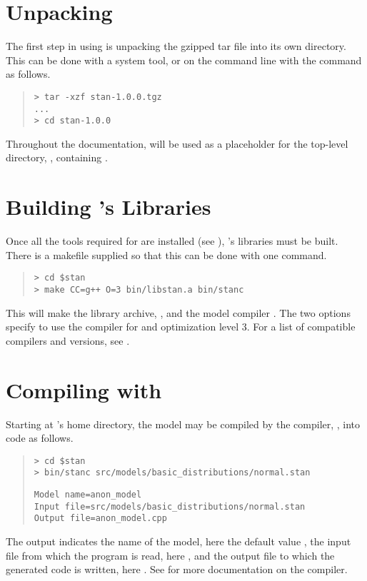 \section{Unpacking \Stan}

The first step in using \Stan is unpacking the gzipped tar file into
its own directory.  This can be done with a system tool, or on the
command line with the  command as follows.
%
\begin{quote}
\begin{Verbatim}[fontshape=sl]
> tar -xzf stan-1.0.0.tgz
...
> cd stan-1.0.0
\end{Verbatim}
\end{quote}
%
Throughout the documentation,  will be used as a
placeholder for the top-level directory, , containing
\Stan.


\section{Building \Stan's Libraries}

Once all the tools required for \Stan are installed (see
), \Stan's libraries must be built.  There is a
makefile supplied so that this can be done with one command.
%
\begin{quote}
\begin{Verbatim}[fontshape=sl]
> cd $stan
> make CC=g++ O=3 bin/libstan.a bin/stanc
\end{Verbatim}
\end{quote}
%
This will make the \Stan library archive, , and the
model compiler .  The two options specify to use the
 compiler for \Cpp and optimization level 3.  For a list
of compatible compilers and versions, see .




\section{Compiling  with }

Starting at \Stan's home directory, the model may be compiled by 
the \Stan compiler, \stanc, into \Cpp code as follows.
%
\begin{quote}
\begin{Verbatim}[fontshape=sl]
> cd $stan
> bin/stanc src/models/basic_distributions/normal.stan
\end{Verbatim}
%
\begin{Verbatim}
Model name=anon_model
Input file=src/models/basic_distributions/normal.stan
Output file=anon_model.cpp
\end{Verbatim}
\end{quote}
%
The output indicates the name of the model, here the default value
, the input file from which the \Stan program is
read, here , and the output file to which the
generated \Cpp code is written, here .  See
 for more documentation on the \stanc compiler.

